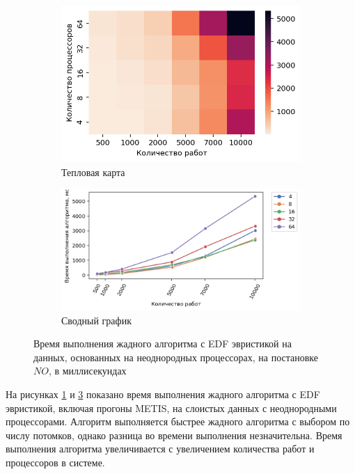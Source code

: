 \begin{figure}[!htbp]
    \centering
    \begin{subfigure}{0.49\textwidth}
        \includegraphics[width=\textwidth]{imgs/unbalanced/NO_EDF/et_heatmap.png}
        \caption{Тепловая карта}
        \label{fig:NO-unbalanced-EDF-exec-time-heatmap}
    \end{subfigure}
    \hfill
    \begin{subfigure}{0.49\textwidth}
        \includegraphics[width=\textwidth]{imgs/unbalanced/NO_EDF/tr_graph.png}
        \caption{Сводный график}
        \label{fig:NO-unbalanced-EDF-exec-time-compiled}
    \end{subfigure}
    \caption{Время выполнения жадного алгоритма с EDF эвристикой на данных, основанных на неоднородных процессорах, на постановке $NO$, в миллисекундах}
\end{figure}

На рисунках \ref{fig:NO-unbalanced-EDF-exec-time-heatmap} и \ref{fig:NO-unbalanced-EDF-exec-time-compiled} показано время выполнения жадного алгоритма с EDF эвристикой, включая прогоны METIS, на слоистых данных с неоднородными процессорами. Алгоритм выполняется быстрее жадного алгоритма с выбором по числу потомков, однако разница во времени выполнения незначительна. Время выполнения алгоритма увеличивается с увеличением количества работ и процессоров в системе.

